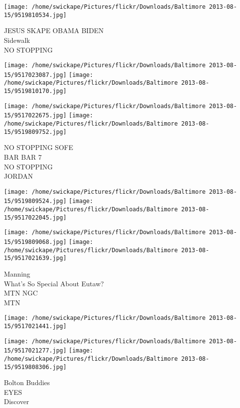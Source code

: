 \documentclass[10pt,letterpaper]{article}
\begin{document}
\vspace{0.25in}
\texttt{[image: /home/swickape/Pictures/flickr/Downloads/Baltimore 2013-08-15/9519810534.jpg]}

JESUS SKAPE OBAMA BIDEN\\
Sidewalk\\
NO STOPPING\\
\pagebreak

\texttt{[image: /home/swickape/Pictures/flickr/Downloads/Baltimore 2013-08-15/9517023087.jpg]}
\texttt{[image: /home/swickape/Pictures/flickr/Downloads/Baltimore 2013-08-15/9519810170.jpg]}

\texttt{[image: /home/swickape/Pictures/flickr/Downloads/Baltimore 2013-08-15/9517022675.jpg]}
\texttt{[image: /home/swickape/Pictures/flickr/Downloads/Baltimore 2013-08-15/9519809752.jpg]}

NO STOPPING SOFE\\
BAR BAR 7\\
NO STOPPING\\
JORDAN\\
\pagebreak

\texttt{[image: /home/swickape/Pictures/flickr/Downloads/Baltimore 2013-08-15/9519809524.jpg]}
\texttt{[image: /home/swickape/Pictures/flickr/Downloads/Baltimore 2013-08-15/9517022045.jpg]}

\texttt{[image: /home/swickape/Pictures/flickr/Downloads/Baltimore 2013-08-15/9519809068.jpg]}
\texttt{[image: /home/swickape/Pictures/flickr/Downloads/Baltimore 2013-08-15/9517021639.jpg]}

Manning\\
What's So Special About Eutaw?\\
MTN NGC\\
MTN\\
\pagebreak

\texttt{[image: /home/swickape/Pictures/flickr/Downloads/Baltimore 2013-08-15/9517021441.jpg]}

\vspace{0.25in}
\texttt{[image: /home/swickape/Pictures/flickr/Downloads/Baltimore 2013-08-15/9517021277.jpg]}
\texttt{[image: /home/swickape/Pictures/flickr/Downloads/Baltimore 2013-08-15/9519808306.jpg]}

Bolton Buddies\\
EYES\\
Discover\\
\pagebreak
\end{document}
